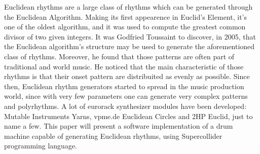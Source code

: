 \documentclass[main.tex]{subfiles}
\begin{document}
Euclidean rhythms are a large class of rhythms which can be generated through the Euclidean Algorithm. Making its first appearence in Euclid’s Element, it’s one of the oldest algorithm, and it was used to compute the greatest common divisor of two given integers. 
It was Godfried Toussaint to discover, in 2005, that the Euclidean algorithm’s structure may be used to generate the aforementioned class of rhythms. Moreover, he found that those patterns are often part of traditional and world music\cite{Toussaint:2004:euclidean:rhythm}. He noticed that the main characteristic of those rhythms is that their onset pattern are distribuited as evenly as possible.
Since then, Euclidean rhythm generators started to spread in the music production world, since with very few parameters one can generate very complex patterns and polyrhythms. A lot of eurorack synthesizer modules have been developed: Mutable Instruments Yarns\cite{MutableInstruments:Yarns}, vpme.de Euclidean Circles\cite{vpme.de} and 2HP Euclid\cite{2hp:Euclid}, just to name a few. 
This paper will present a software implementation of a drum machine capable of generating Euclidean rhythms, using Supercollider programming language.
\end{document}
